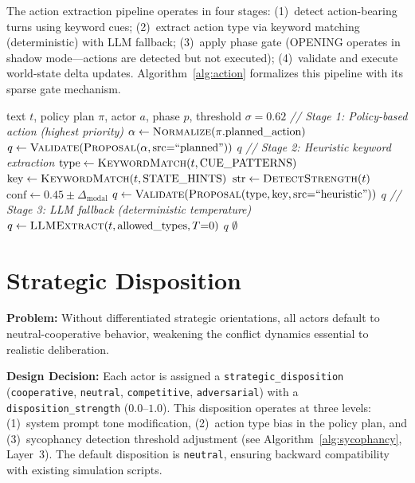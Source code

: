 The action extraction pipeline operates in four stages: (1)~detect action-bearing turns using keyword cues; (2)~extract action type via keyword matching (deterministic) with LLM fallback; (3)~apply phase gate (OPENING operates in shadow mode---actions are detected but not executed); (4)~validate and execute world-state delta updates. Algorithm~\ref{alg:action} formalizes this pipeline with its sparse gate mechanism.

\begin{algorithm}[t]
\caption{Action Extraction Pipeline}
\label{alg:action}
\begin{algorithmic}[1]
\Require text $t$, policy plan $\pi$, actor $a$, phase $p$, threshold $\sigma = 0.62$
\State \textit{// Stage 1: Policy-based action (highest priority)}
    \State $\alpha \gets \textsc{Normalize}(\pi.\text{planned\_action})$
     
        \State $q \gets \textsc{Validate}(\textsc{Proposal}(\alpha, \text{src}{=}\text{``planned''}))$
         \Return $q$ \EndIf
    \EndIf
\EndIf
\State \textit{// Stage 2: Heuristic keyword extraction}
    \State $\text{type} \gets \textsc{KeywordMatch}(t, \text{CUE\_PATTERNS})$
    \State $\text{key} \gets \textsc{KeywordMatch}(t, \text{STATE\_HINTS})$
    \State $\text{str} \gets \textsc{DetectStrength}(t)$ 
    \State $\text{conf} \gets 0.45 \pm \Delta_{\text{modal}}$ 
    \State $q \gets \textsc{Validate}(\textsc{Proposal}(\text{type}, \text{key}, \text{src}{=}\text{``heuristic''}))$
        \State \Return $q$
    \EndIf
\EndIf
\State \textit{// Stage 3: LLM fallback (deterministic temperature)}
    \State $q \gets \textsc{LLMExtract}(t, \text{allowed\_types}, T{=}0)$ 
     \Return $q$ \EndIf
\EndIf
\State \Return $\emptyset$
\end{algorithmic}
\end{algorithm}


\section{Strategic Disposition}

\textbf{Problem:} Without differentiated strategic orientations, all actors default to neutral-cooperative behavior, weakening the conflict dynamics essential to realistic deliberation.

\textbf{Design Decision:} Each actor is assigned a \texttt{strategic\_disposition} (\texttt{cooperative}, \texttt{neutral}, \texttt{competitive}, \texttt{adversarial}) with a \texttt{disposition\_strength} ($0.0$--$1.0$). This disposition operates at three levels: (1)~system prompt tone modification, (2)~action type bias in the policy plan, and (3)~sycophancy detection threshold adjustment (see Algorithm~\ref{alg:sycophancy}, Layer~3). The default disposition is \texttt{neutral}, ensuring backward compatibility with existing simulation scripts.

